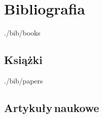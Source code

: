 
\clearpage
\chapter*{Bibliografia}



\begin{btSect}[plain]{./bib/books}
 \section*{Książki}
 \btPrintCited
\end{btSect}

\begin{btSect}[plain]{./bib/papers}
 \section*{Artykuły\,naukowe}
 \btPrintCited
\end{btSect}


\clearpage
{}


